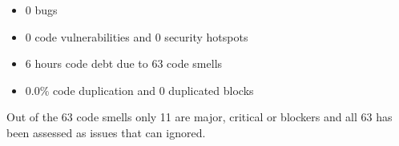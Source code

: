 \begin{itemize}
    \item 0 bugs
    \item 0 code vulnerabilities and 0 security hotspots
    \item 6 hours code debt due to 63 code smells
    \item 0.0\% code duplication and 0 duplicated blocks
\end{itemize}

Out of the 63 code smells only 11 are major, critical or blockers and all 63 has been assessed as issues that can ignored.


